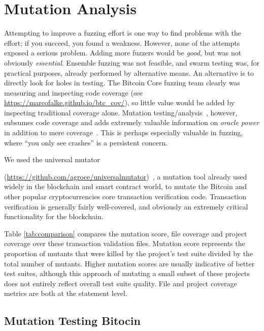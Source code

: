 \section{Mutation Analysis}

Attempting to improve a fuzzing effort is one way to find problems
with the effort; if you succeed, you found a weakness.  However, none
of the attempts exposed a serious problem.  Adding more fuzzers would
be \emph{good}, but was not obviously \emph{essential}.  Ensemble
fuzzing was not feasible, and swarm testing was, for practical
purposes, already performed by alternative means.  An alternative is
to directly look for holes in testing.  The Bitcoin Core fuzzing team
clearly was measuring and inspecting code coverage (see \url{https://marcofalke.github.io/btc_cov/}), so little value
would be added by inspecting traditional coverage alone.  Mutation
testing/analysis~\cite{MutationSurvey}, however, subsumes code coverage and adds extremely
valuable information on \emph{oracle power} in addition to mere
coverage~\cite{Discontents}.  This is perhaps especially valuable in fuzzing, where ``you
only see crashes'' is a persistent concern.

We used the universal mutator 

\noindent(\url{https://github.com/agroce/universalmutator})~\cite{regexpMut}, 
a mutation tool already used widely in the blockchain and smart contract
world, to mutate the Bitcoin and other popular cryptocurrencies core transaction verification code. 
Transaction verification is generally fairly well-covered, and obviously an extremely critical functionality for the
blockchain. 

Table \ref{tab:comparison} compares the mutation score, file coverage and project coverage over these transaction validation files. Mutation score represents the proportion
of mutants that were killed by the project's test suite divided by the total number of mutants. Higher mutation scores are usually indicative of better test suites, although this approach
of mutating a small subset of these projects does not entirely reflect overall test suite quality. File and project coverage metrics are both at the statement level.

\subsection{Mutation Testing Bitocin}

